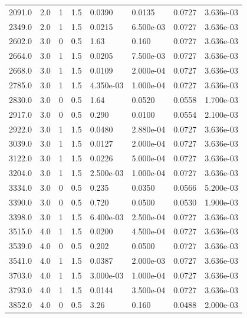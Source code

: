 \documentclass[preview]{standalone}
\begin{document}
{{\begin{tabular}{L{1.2cm}C{1.2cm} C{0.3cm}C{0.5cm} C{1.4cm}C{1.4cm} C{1.4cm}C{1.4cm}}
  2091.0  &   2.0  & 1     & 1.5 &  0.0390  & 0.0135  & 0.0727 &  3.636e-03   \\ 
  2349.0  &   2.0  & 1     & 1.5 &  0.0215  & 6.500e-03  & 0.0727 &  3.636e-03   \\ 
  2602.0  &   3.0  & 0     & 0.5 &  1.63  & 0.160  & 0.0727 &  3.636e-03   \\ 
  2664.0  &   3.0  & 1     & 1.5 &  0.0205  & 7.500e-03  & 0.0727 &  3.636e-03   \\ 
  2668.0  &   3.0  & 1     & 1.5 &  0.0109  & 2.000e-04  & 0.0727 &  3.636e-03   \\ 
  2785.0  &   3.0  & 1     & 1.5 &  4.350e-03  & 1.000e-04  & 0.0727 &  3.636e-03   \\ 
  2830.0  &   3.0  & 0     & 0.5 &  1.64  & 0.0520  & 0.0558 &  1.700e-03   \\ 
  2917.0  &   3.0  & 0     & 0.5 &  0.290  & 0.0100  & 0.0554 &  2.100e-03   \\ 
  2922.0  &   3.0  & 1     & 1.5 &  0.0480  & 2.880e-04  & 0.0727 &  3.636e-03   \\ 
  3039.0  &   3.0  & 1     & 1.5 &  0.0127  & 2.000e-04  & 0.0727 &  3.636e-03   \\ 
  3122.0  &   3.0  & 1     & 1.5 &  0.0226  & 5.000e-04  & 0.0727 &  3.636e-03   \\ 
  3204.0  &   3.0  & 1     & 1.5 &  2.500e-03  & 1.000e-04  & 0.0727 &  3.636e-03   \\ 
  3334.0  &   3.0  & 0     & 0.5 &  0.235  & 0.0350  & 0.0566 &  5.200e-03   \\ 
  3390.0  &   3.0  & 0     & 0.5 &  0.720  & 0.0500  & 0.0530 &  1.900e-03   \\ 
  3398.0  &   3.0  & 1     & 1.5 &  6.400e-03  & 2.500e-04  & 0.0727 &  3.636e-03   \\ 
  3515.0  &   4.0  & 1     & 1.5 &  0.0200  & 4.500e-04  & 0.0727 &  3.636e-03   \\ 
  3539.0  &   4.0  & 0     & 0.5 &  0.202  & 0.0500  & 0.0727 &  3.636e-03   \\ 
  3541.0  &   4.0  & 1     & 1.5 &  0.0387  & 2.000e-03  & 0.0727 &  3.636e-03   \\ 
  3703.0  &   4.0  & 1     & 1.5 &  3.000e-03  & 1.000e-04  & 0.0727 &  3.636e-03   \\ 
  3793.0  &   4.0  & 1     & 1.5 &  0.0144  & 3.500e-04  & 0.0727 &  3.636e-03   \\ 
  3852.0  &   4.0  & 0     & 0.5 &  3.26  & 0.160  & 0.0488 &  2.000e-03   \\ 

\end{tabular}}}
\end{document}
